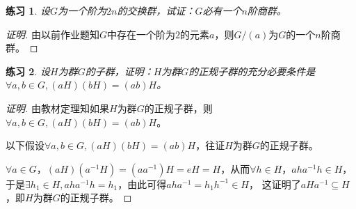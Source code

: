 \documentclass{article}
\newtheorem{Exercise}{练习}
\begin{document}
\begin{CJK*}{UTF8}{gbsn}

\begin{Exercise}
设$G$为一个阶为$2n$的交换群，试证：$G$必有一个$n$阶商群。
\end{Exercise}
\begin{proof}[证明]
  由以前作业题知$G$中存在一个阶为$2$的元素$a$，则$G/(a)$为$G$的一个$n$阶商群。
\end{proof}
\begin{Exercise}
设$H$为群$G$的子群，证明：$H$为群$G$的正规子群的充分必要条件是$\forall a,b\in G,(aH)(bH)=(ab)H$。
\end{Exercise}

\begin{proof}[证明]
  由教材定理知如果$H$为群$G$的正规子群，则$\forall a,b\in G,(aH)(bH)=(ab)H$。

  以下假设$\forall a,b\in G,(aH)(bH)=(ab)H$，往证$H$为群$G$的正规子群。

  $\forall a\in G$，$(aH)(a^{-1}H)=(aa^{-1})H=eH=H$，从而$\forall h\in H$，$aha^{-1}h\in H$，于是$\exists h_1\in H, aha^{-1}h=h_1$，由此可得$aha^{-1}=h_1h^{-1}\in H$，
  这证明了$aHa^{-1}\subseteq H$，即$H$为群$G$的正规子群。
\end{proof}
\end{CJK*}
\end{document}
